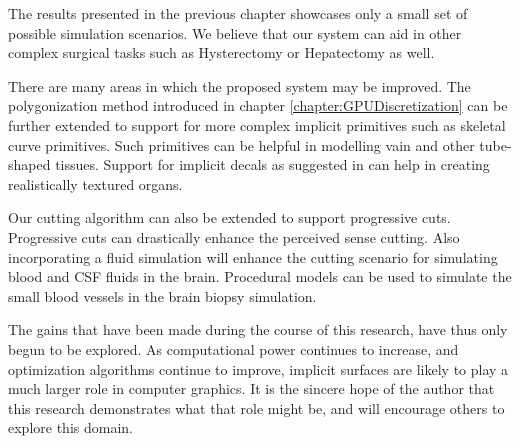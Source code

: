 The results presented in the previous chapter showcases only a small set of possible simulation scenarios. We believe that our 
system can aid in other complex surgical tasks such as Hysterectomy or Hepatectomy as well. 

There are many areas in which the proposed system may be improved. The polygonization method introduced in chapter \ref{chapter:GPUDiscretization} can be further 
extended to support for more complex implicit primitives such as skeletal curve primitives. Such primitives can be helpful in modelling vain and other tube-shaped
tissues. Support for implicit decals as suggested in \cite{Schmidtb} can help in creating realistically textured organs. 

Our cutting algorithm can also be extended to support progressive cuts. Progressive cuts can drastically enhance the perceived sense cutting. 
Also incorporating a fluid simulation will enhance the cutting scenario for simulating blood and CSF fluids in the brain.
Procedural models can be used to simulate the small blood vessels in the brain biopsy simulation. 

The gains that have been made during the course of this research, have thus only begun to be explored. As computational
power continues to increase, and optimization algorithms continue to improve, implicit surfaces are likely to play a much larger role in 
computer graphics. It is the sincere hope of the author that this research demonstrates what that role might be, and will encourage others
to explore this domain.
